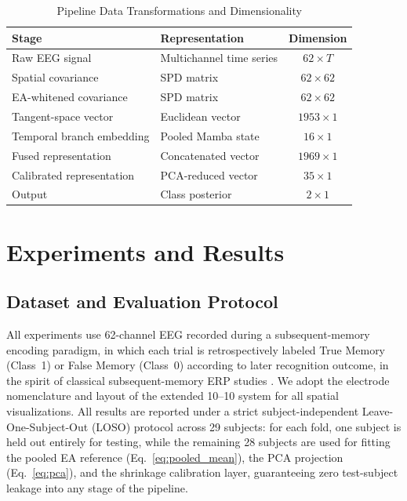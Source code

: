 \documentclass[journal]{IEEEtran}
\begin{document}
\begin{table}[htbp]
\centering
\caption{Pipeline Data Transformations and Dimensionality}
\label{tab:dimensions}
\begin{tabular}{@{}llc@{}}
\toprule
\textbf{Stage} & \textbf{Representation} & \textbf{Dimension} \\
\midrule
Raw EEG signal & Multichannel time series & $62 \times T$ \\
Spatial covariance & SPD matrix & $62 \times 62$ \\
EA-whitened covariance & SPD matrix & $62 \times 62$ \\
Tangent-space vector & Euclidean vector & $1953 \times 1$ \\
Temporal branch embedding & Pooled Mamba state & $16 \times 1$ \\
Fused representation & Concatenated vector & $1969 \times 1$ \\
Calibrated representation & PCA-reduced vector & $35 \times 1$ \\
Output & Class posterior & $2 \times 1$ \\
\bottomrule
\end{tabular}
\end{table}

\section{Experiments and Results}
\label{sec:results}

\subsection{Dataset and Evaluation Protocol}
All experiments use 62-channel EEG recorded during a subsequent-memory encoding paradigm, in which each trial is retrospectively labeled True Memory (Class~1) or False Memory (Class~0) according to later recognition outcome, in the spirit of classical subsequent-memory ERP studies \cite{paller2002observing,curran2000brain,rugg2007event}. We adopt the electrode nomenclature and layout of the extended 10--10 system for all spatial visualizations. All results are reported under a strict subject-independent Leave-One-Subject-Out (LOSO) protocol across 29 subjects: for each fold, one subject is held out entirely for testing, while the remaining 28 subjects are used for fitting the pooled EA reference (Eq.~\eqref{eq:pooled_mean}), the PCA projection (Eq.~\eqref{eq:pca}), and the shrinkage calibration layer, guaranteeing zero test-subject leakage into any stage of the pipeline.
\end{document}
